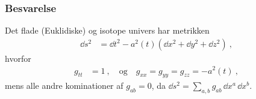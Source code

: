 \documentclass[../main.tex]{subfiles}
\begin{document}

\subsubsection*{Besvarelse}

Det flade (Euklidiske) og isotope univers har metrikken
\begin{align}
    \dd s^2 &= \dd t^2 - a^2(t) \left( \dd x^2 + \dd y^2 + \dd z^2 \right) \: ,
\end{align}
hvorfor
\begin{align}
    g_{tt} &= 1 \: , \quad \text{og} \quad
    g_{xx} = g_{yy} = g_{zz} = - a^2(t) \: ,
\end{align}
mens alle andre kominationer af $g_{ab} = 0$, da $\dd s^2 = \sum_{a,b} g_{ab}\, \dd x^a\, \dd x^b$.
\end{document}
